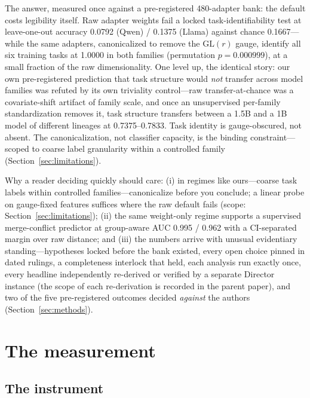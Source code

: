 \documentclass{article}
\begin{document}
The answer, measured once against a pre-registered 480-adapter bank: the
default costs legibility itself. Raw adapter weights fail a locked
task-identifiability test at leave-one-out accuracy 0.0792 (Qwen) / 0.1375
(Llama) against chance 0.1667---while the same adapters, canonicalized to
remove the $\mathrm{GL}(r)$ gauge, identify all six training tasks at
1.0000 in both families (permutation $p = 0.000999$), at a small fraction
of the raw dimensionality. One level up, the identical story: our own
pre-registered prediction that task structure would \emph{not} transfer
across model families was refuted by its own triviality control---raw
transfer-at-chance was a covariate-shift artifact of family scale, and once
an unsupervised per-family standardization removes it, task structure
transfers between a 1.5B and a 1B model of different lineages at
0.7375--0.7833. Task identity is gauge-obscured, not absent. The
canonicalization, not classifier capacity, is the binding
constraint---scoped to coarse label granularity within a controlled family
(Section~\ref{sec:limitations}).

Why a reader deciding quickly should care: (i) in regimes like
ours---coarse task labels within controlled families---canonicalize before
you conclude; a linear probe on gauge-fixed features suffices where the
raw default fails (scope: Section~\ref{sec:limitations}); (ii) the same
weight-only regime supports a supervised merge-conflict predictor at
group-aware AUC 0.995 / 0.962 with a CI-separated margin over raw
distance; and (iii) the numbers arrive with unusual evidentiary
standing---hypotheses locked before the bank existed, every open choice
pinned in dated rulings, a completeness interlock that held, each analysis
run exactly once, every headline independently re-derived or verified by a
separate Director instance (the scope of each re-derivation is recorded in
the parent paper), and two of the five pre-registered outcomes decided
\emph{against} the authors (Section~\ref{sec:methods}).

\section{The measurement}
\label{sec:measurement}

\subsection{The instrument}
\label{sec:instrument}
\end{document}

